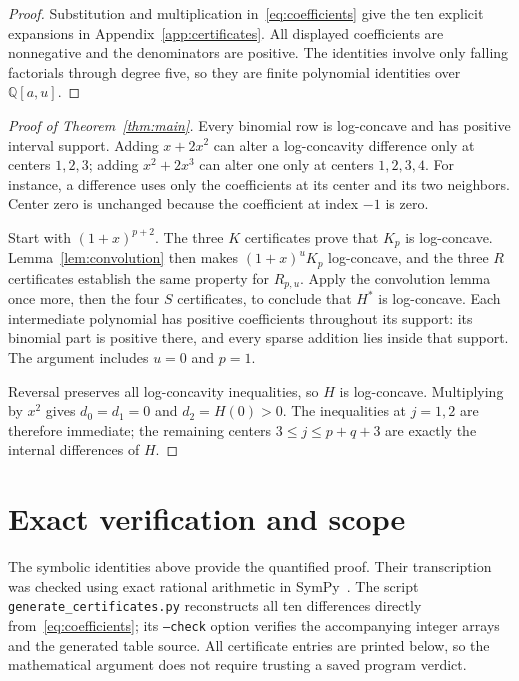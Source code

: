 \documentclass[11pt,a4paper]{article}
\begin{document}
\begin{proof}
Substitution and multiplication in~\eqref{eq:coefficients} give the
ten explicit expansions in Appendix~\ref{app:certificates}. All displayed
coefficients are nonnegative and the denominators are positive.
The identities involve only falling factorials through degree five, so they
are finite polynomial identities over $\mathbb{Q}[a,u]$.
\end{proof}

\begin{proof}[Proof of Theorem~\ref{thm:main}]
Every binomial row is log-concave and has positive interval support.
Adding $x+2x^2$ can alter a log-concavity difference only at centers $1,2,3$;
adding $x^2+2x^3$ can alter one only at centers $1,2,3,4$.
For instance, a difference uses only the coefficients at its center and
its two neighbors. Center zero is unchanged because the coefficient at
index $-1$ is zero.

Start with $(1+x)^{p+2}$. The three $K$ certificates prove that $K_p$ is
log-concave. Lemma~\ref{lem:convolution} then makes $(1+x)^uK_p$
log-concave, and the three $R$ certificates establish the same property
for $R_{p,u}$. Apply the convolution lemma once more, then the four $S$
certificates, to conclude that $H^*$ is log-concave.
Each intermediate polynomial has positive coefficients throughout its
support: its binomial part is positive there, and every sparse addition
lies inside that support. The argument includes $u=0$ and $p=1$.

Reversal preserves all log-concavity inequalities, so $H$ is log-concave.
Multiplying by $x^2$ gives $d_0=d_1=0$ and $d_2=H(0)>0$.
The inequalities at $j=1,2$ are therefore immediate; the remaining centers
$3\leq j\leq p+q+3$ are exactly the internal differences of $H$.
\end{proof}

\section{Exact verification and scope}

The symbolic identities above provide the quantified proof. Their transcription
was checked using exact rational arithmetic in SymPy~\cite{Meurer2017}.
The script \texttt{generate\_certificates.py} reconstructs
all ten differences directly from~\eqref{eq:coefficients}; its
\texttt{--check} option verifies the accompanying integer arrays and the
generated table source. All certificate entries are printed below, so the
mathematical argument does not require trusting a saved program verdict.
\end{document}
